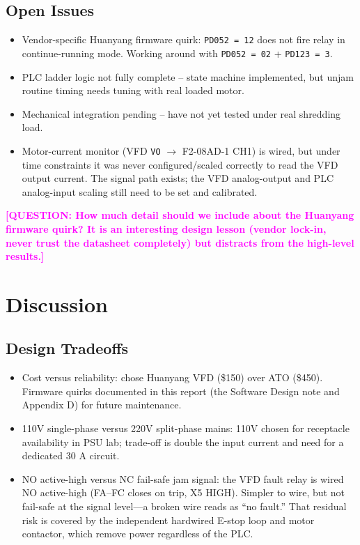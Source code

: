 \documentclass[hidelinks,12pt]{article}
\newcommand{\question}[1]{\textcolor{magenta}{\textbf{[QUESTION: #1]}}}
\begin{document}
\subsection{Open Issues}
\begin{itemize}
    \item Vendor-specific Huanyang firmware quirk: \texttt{PD052 = 12} does not fire relay in continue-running mode. Working around with \texttt{PD052 = 02} + \texttt{PD123 = 3}.
    \item PLC ladder logic not fully complete -- state machine implemented, but unjam routine timing needs tuning with real loaded motor.
    \item Mechanical integration pending -- have not yet tested under real shredding load.
    \item Motor-current monitor (VFD \texttt{VO} $\rightarrow$ F2-08AD-1 CH1) is wired, but under time constraints it was never configured/scaled correctly to read the VFD output current. The signal path exists; the VFD analog-output and PLC analog-input scaling still need to be set and calibrated.
\end{itemize}

\question{How much detail should we include about the Huanyang firmware quirk? It is an interesting design lesson (vendor lock-in, never trust the datasheet completely) but distracts from the high-level results.}

\section{Discussion}

\subsection{Design Tradeoffs}
\begin{itemize}
    \item Cost versus reliability: chose Huanyang VFD (\$150) over ATO (\$450). Firmware quirks documented in this report (the Software Design note and Appendix D) for future maintenance.
    \item 110V single-phase versus 220V split-phase mains: 110V chosen for receptacle availability in PSU lab; trade-off is double the input current and need for a dedicated 30 A circuit.
    \item NO active-high versus NC fail-safe jam signal: the VFD fault relay is wired NO active-high (FA--FC closes on trip, X5 HIGH). Simpler to wire, but not fail-safe at the signal level---a broken wire reads as ``no fault.'' That residual risk is covered by the independent hardwired E-stop loop and motor contactor, which remove power regardless of the PLC.
\end{itemize}
\end{document}
